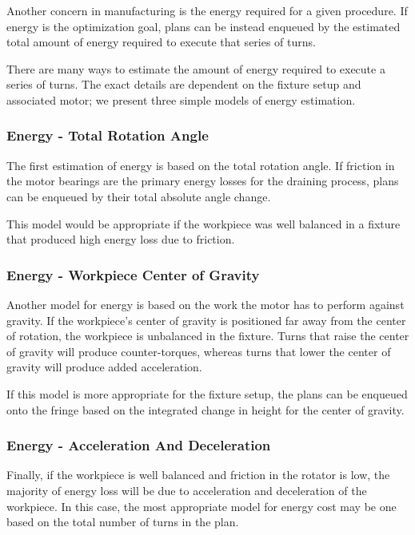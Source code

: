 Another concern in manufacturing is the energy required for a given procedure. If energy is the optimization goal, plans can be instead enqueued by the estimated total amount of energy required to execute that series of turns.


There are many ways to estimate the amount of energy required to execute a series of turns. The exact details are dependent on the fixture setup and associated motor; we present three simple models of energy estimation.

		\subsubsection{Energy - Total Rotation Angle}

The first estimation of energy is based on the total rotation angle. If friction in the motor bearings are the primary energy losses for the draining process, plans can be enqueued by their total absolute angle change.

This model would be appropriate if the workpiece was well balanced in a fixture that produced high energy loss due to friction.

		\subsubsection{Energy - Workpiece Center of Gravity}

Another model for energy is based on the work the motor has to perform against gravity. If the workpiece's center of gravity is positioned far away from the center of rotation, the workpiece is unbalanced in the fixture. Turns that raise the center of gravity will produce counter-torques, whereas turns that lower the center of gravity will produce added acceleration.

If this model is more appropriate for the fixture setup, the plans can be enqueued onto the fringe based on the integrated change in height for the center of gravity.

		\subsubsection{Energy - Acceleration And Deceleration}

Finally, if the workpiece is well balanced and friction in the rotator is low, the majority of energy loss will be due to acceleration and deceleration of the workpiece. In this case, the most appropriate model for energy cost may be one based on the total number of turns in the plan.

